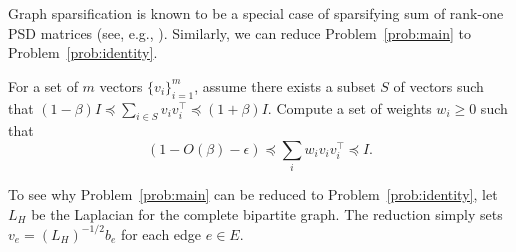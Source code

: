 Graph sparsification is known to be a special case of sparsifying sum of rank-one PSD matrices (see, e.g., \citep{BatsonSS12}).
Similarly, we can reduce Problem~\ref{prob:main} to Problem~\ref{prob:identity}.

\begin{problem}
\label{prob:identity}
For a set of $m$ vectors $\{v_i\}_{i=1}^m$, assume there exists a subset $S$ of vectors such that $(1-\beta)I\preceq \sum_{i \in S} v_i v_i^\top \preceq (1+\beta)I$. Compute a set of weights $w_i \ge 0$ such that
\[
\textstyle (1-O(\beta)-\epsilon) \preceq \sum_{i} w_i v_i v_i^\top \preceq I.
\]
\end{problem}

To see why Problem~\ref{prob:main} can be reduced to Problem~\ref{prob:identity}, let $L_H$ be the Laplacian for the complete bipartite graph. The reduction simply sets $v_e = (L_H)^{-1/2} b_e$ for each edge $e\in E$.%

%
%
%
